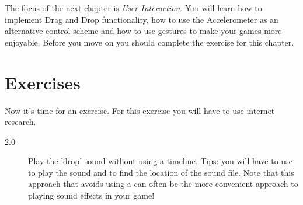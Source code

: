 The focus of the next chapter is \textit{User Interaction}. You will learn how
to implement Drag and Drop functionality, how to use the Accelerometer as an
alternative control scheme and how to use gestures to make your games more
enjoyable. Before you move on you should complete the exercise for this chapter.

\section{Exercises}
Now it's time for an exercise. For this exercise you will have to use internet
research.
\begin{description}
\item[2.0] Play the 'drop' sound without using a \SB{} timeline. Tips: you will
have to use  to play the sound and
 to find the location of the sound file. Note that this
approach that avoids using a \SB{} can often be the more convenient approach to
playing sound effects in your game!
\end{description}